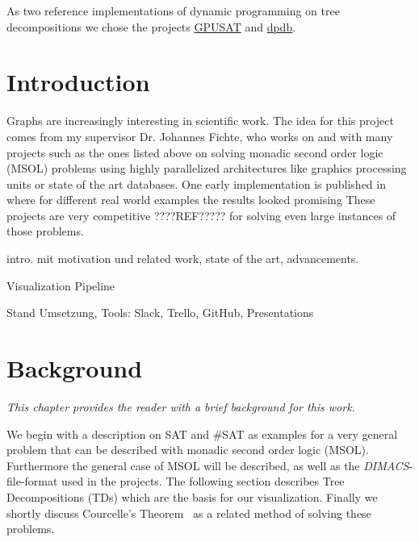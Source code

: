 \documentclass[a4paper, 12pt]{scrartcl}
\begin{document}
As two reference implementations of dynamic programming on tree decompositions we chose the projects \href{https://github.com/daajoe/GPUSAT}{GPUSAT} and \href{https://github.com/hmarkus/dp_on_dbs}{dpdb}.

\newpage

\tableofcontents

\newpage


\section{Introduction}
Graphs are increasingly interesting in scientific work.
The idea for this project comes from my supervisor Dr. Johannes Fichte, who works on and with many projects such as the ones listed above on solving monadic second order logic (MSOL\cite{Courcelle2012}) problems using highly parallelized architectures like graphics processing units or state of the art databases.
One early implementation is published in \cite{evaluationMSO} where for different real world examples the results looked promising
These projects are very competitive ????REF????? for solving even large instances of those problems.

intro. mit motivation und related work, state of the art, advancements.


Visualization Pipeline

Stand Umsetzung, Tools: Slack, Trello, GitHub, Presentations


\newpage
\section{Background}
\textit{This chapter provides the reader with a brief background for this work}.

We begin with a description on SAT and \#SAT as examples for a very general problem that can be described with monadic second order logic (MSOL).
Furthermore the general case of MSOL will be described, as well as the \textit{DIMACS}-file-format used in the projects.
The following section describes Tree Decompositions (TDs) which are the basis for our visualization. 
Finally we shortly discuss Courcelle's Theorem~\cite{Courcelle2012} as a related method of solving these problems.
\end{document}
